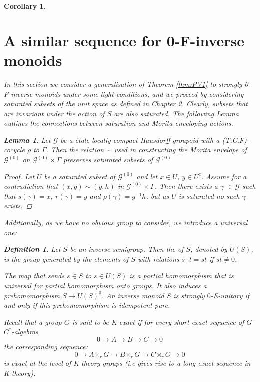 \documentclass[11pt]{amsart}
\theoremstyle{plain}
\newtheorem{lemma}[theorem]{Lemma}%
\newtheorem{corollary}[theorem]{Corollary}%
\theoremstyle{definition}%
\newtheorem{definition}[theorem]{Definition}%
\theoremstyle{remark}%
\newcommand{\G}{\mathcal{G}}
\begin{document}
\begin{corollary}
\section{A similar sequence for 0-F-inverse monoids}\label{sect:S2}
In this section we consider a generalisation of Theorem \ref{thm:PV1} to strongly 0-F-inverse monoids under some light conditions, and we proceed by considering saturated subsets of the unit space as defined in Chapter 2. Clearly, subsets that are invariant under the action of $S$ are also saturated. The following Lemma outlines the connections between saturation and Morita enveloping actions.

\begin{lemma}\label{Lem:Cut}
Let $\G$ be a \'etale locally compact Hausdorff groupoid with a (T,C,F)-cocycle $\rho$ to $\Gamma$. Then the relation $\sim$ used in constructing the Morita envelope of $\G^{(0)}$ on $\G^{(0)} \times \Gamma$ preserves saturated subsets of $\G^{(0)}$
\end{lemma}
\begin{proof}
Let $U$ be a saturated subset of $\G^{(0)}$ and let $x \in U$, $y \in U^{c}$. Assume for a contradiction that $(x,g) \sim (y,h)$ in $\G^{(0)} \times \Gamma$. Then there exists a $\gamma$ $\in \G$ such that $s(\gamma)=x$, $r(\gamma)=y$ and $\rho(\gamma)=g^{-1}h$, but as $U$ is saturated no such $\gamma$ exists. 
\end{proof}

Additionally, as we have no obvious group to consider, we introduce a universal one:

\begin{definition}
Let $S$ be an inverse semigroup. Then the  of $S$, denoted by $U(S)$, is the group generated by the elements of $S$ with relations $s\cdot t = st$ if $st \not = 0$.
\end{definition}

The map that sends $s \in S$ to $s \in U(S)$ is a partial homomorphism that is universal for partial homomorphism onto groups. It also induces a prehomomorphism $S \rightarrow U(S)^{0}$. An inverse monoid $S$ is strongly $0$-E-unitary if and only if this prehomomorphism is idempotent pure.

Recall that a group $G$ is said to be \textit{K-exact} if for every short exact sequence of $G$-$C^{*}$-algebras
\begin{equation*}
0 \rightarrow A \rightarrow B \rightarrow C \rightarrow 0
\end{equation*}
the corresponding sequence:
\begin{equation*}
0 \rightarrow A\rtimes_{r}G \rightarrow B\rtimes_{r}G \rightarrow C\rtimes_{r}G \rightarrow 0
\end{equation*}
is exact at the level of K-theory groups (i.e gives rise to a long exact sequence in K-theory).


\end{corollary}
\end{document}
